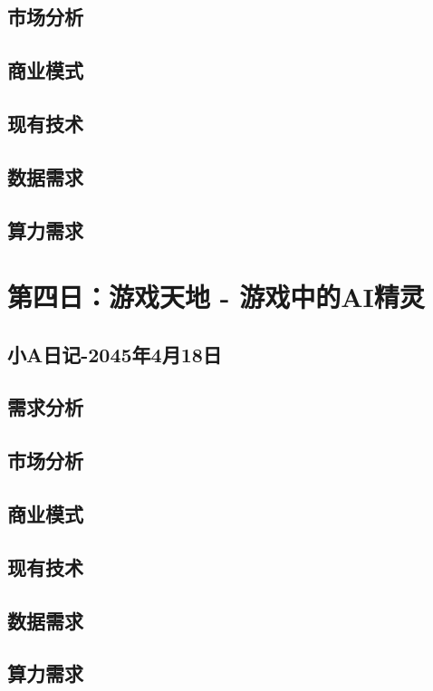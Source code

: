 \subsection{市场分析}
\subsection{商业模式}
\subsection{现有技术}
\subsection{数据需求}
\subsection{算力需求}

\section{第四日：游戏天地 - 游戏中的AI精灵}
\subsection{小A日记-2045年4月18日}
\subsection{需求分析}
\subsection{市场分析}
\subsection{商业模式}
\subsection{现有技术}
\subsection{数据需求}
\subsection{算力需求}

\section{}
